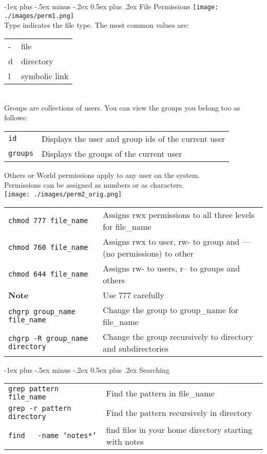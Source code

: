 \documentclass[10pt,landscape]{article}
\makeatletter
\renewcommand{\section}{\@startsection{section}{1}{0mm}%
                                {-1ex plus -.5ex minus -.2ex}%
                                {0.5ex plus .2ex}%
                                {\normalfont\large\bfseries}}
\makeatother
\begin{document}
\begin{multicols}{2}
\section{File Permissions}
\texttt{[image: ./images/perm1.png]} \\
Type indicates the file type. The most common values are: \\ 
\begin{tabular}{@{}ll@{}}
 - & file \\
 d & directory \\
 l & symbolic link
\end{tabular}
\\
Groups are collections of users. You can view the groups you belong too as follows: \\
\begin{tabular}{@{}ll@{}}
 \texttt{id} & Displays the user and group ids of the current user \\
 \texttt{groups} & Displays the groups of the current user
\end{tabular}
Others or World permissions apply to any user on the system. \\
Permissions can be assigned as numbers or as characters. \\
\texttt{[image: ./images/perm2\_orig.png]} \\
\begin{tabular}{@{}ll@{}}
\texttt{chmod 777 file\_name} & Assigns rwx permissions to all three levels for file\_name  \\
\texttt{chmod 760 file\_name} & Assigns rwx to user, rw- to group and --- (no permissions) to other \\
\texttt{chmod 644 file\_name} & Assigns rw- to users, r-- to groups and others \\
\textbf{Note} & Use 777 carefully \\
\texttt{chgrp group\_name file\_name} & Change the group to group\_name for file\_name \\
\texttt{chgrp -R group\_name directory} & Change the group recursively to directory and subdirectories 
\end{tabular}

\section{Searching}
\begin{tabular}{@{}ll@{}}
\texttt{grep pattern file\_name} & Find the pattern in file\_name \\
\texttt{grep -r pattern directory} & Find the pattern recursively in directory \\
\texttt{find ~ -name 'notes*'} & find files in your home directory starting with notes
\end{tabular}


\end{multicols}
\end{document}
